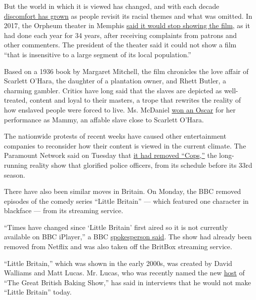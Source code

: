 But the world in which it is viewed has changed, and with each decade
\href{https://www.theatlantic.com/magazine/archive/1999/12/gone-with-the-wind-and-hollywoods-racial-politics/377919/}{discomfort
has grown} as people revisit its racial themes and what was omitted. In
2017, the Orpheum theater in Memphis
\href{https://www.nytimes3xbfgragh.onion/2017/08/27/movies/memphis-theater-cancels-gone-with-the-wind-screening.html}{said
it would stop showing the film}, as it had done each year for 34 years,
after receiving complaints from patrons and other commenters. The
president of the theater said it could not show a film ``that is
insensitive to a large segment of its local population.''

Based on a 1936 book by Margaret Mitchell, the film chronicles the love
affair of Scarlett O'Hara, the daughter of a plantation owner, and Rhett
Butler, a charming gambler. Critics have long said that the slaves are
depicted as well-treated, content and loyal to their masters, a trope
that rewrites the reality of how enslaved people were forced to live.
Ms. McDaniel
\href{https://www.hollywoodreporter.com/features/oscars-first-black-winner-accepted-774335}{won
an Oscar} for her performance as Mammy, an affable slave close to
Scarlett O'Hara.

The nationwide protests of recent weeks have caused other entertainment
companies to reconsider how their content is viewed in the current
climate. The Paramount Network said on Tuesday that
\href{https://www.nytimes3xbfgragh.onion/2020/06/09/business/media/cops-canceled-paramount-tv-show.html}{it
had removed ``Cops,''} the long-running reality show that glorified
police officers, from its schedule before its 33rd season.

There have also been similar moves in Britain. On Monday, the BBC
removed episodes of the comedy series ``Little Britain'' --- which
featured one character in blackface --- from its streaming service.

``Times have changed since `Little Britain' first aired so it is not
currently available on BBC iPlayer,'' a BBC
\href{https://www.bbc.com/news/entertainment-arts-52983319}{spokesperson
said}. The show had already been removed from Netflix and was also taken
off the BritBox streaming service.

``Little Britain,'' which was shown in the early 2000s, was created by
David Walliams and Matt Lucas. Mr. Lucas, who was recently named the new
\href{https://www.theguardian.com/tv-and-radio/2020/mar/11/matt-lucas-to-host-the-great-british-bake-off}{host}
of ``The Great British Baking Show,'' has said in interviews that he
would not make ``Little Britain'' today.

